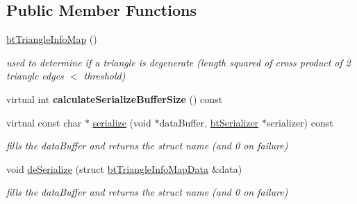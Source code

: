 \subsection*{Public Member Functions}
\begin{DoxyCompactItemize}
\item 
\hypertarget{structbt_triangle_info_map_a60e9096e47e52a03e29004e77d9dd572}{\hyperlink{structbt_triangle_info_map_a60e9096e47e52a03e29004e77d9dd572}{bt\+Triangle\+Info\+Map} ()}\label{structbt_triangle_info_map_a60e9096e47e52a03e29004e77d9dd572}

\begin{DoxyCompactList}\small\item\em used to determine if a triangle is degenerate (length squared of cross product of 2 triangle edges $<$ threshold) \end{DoxyCompactList}\item 
\hypertarget{structbt_triangle_info_map_ac9ea0e3e3ef1620e59a53381c3121f71}{virtual int {\bfseries calculate\+Serialize\+Buffer\+Size} () const }\label{structbt_triangle_info_map_ac9ea0e3e3ef1620e59a53381c3121f71}

\item 
\hypertarget{structbt_triangle_info_map_a04271020827a5cf802def85945d65028}{virtual const char $\ast$ \hyperlink{structbt_triangle_info_map_a04271020827a5cf802def85945d65028}{serialize} (void $\ast$data\+Buffer, \hyperlink{classbt_serializer}{bt\+Serializer} $\ast$serializer) const }\label{structbt_triangle_info_map_a04271020827a5cf802def85945d65028}

\begin{DoxyCompactList}\small\item\em fills the data\+Buffer and returns the struct name (and 0 on failure) \end{DoxyCompactList}\item 
\hypertarget{structbt_triangle_info_map_a729483561a5100a27dae3f92fe57ebca}{void \hyperlink{structbt_triangle_info_map_a729483561a5100a27dae3f92fe57ebca}{de\+Serialize} (struct \hyperlink{structbt_triangle_info_map_data}{bt\+Triangle\+Info\+Map\+Data} \&data)}\label{structbt_triangle_info_map_a729483561a5100a27dae3f92fe57ebca}

\begin{DoxyCompactList}\small\item\em fills the data\+Buffer and returns the struct name (and 0 on failure) \end{DoxyCompactList}\end{DoxyCompactItemize}
